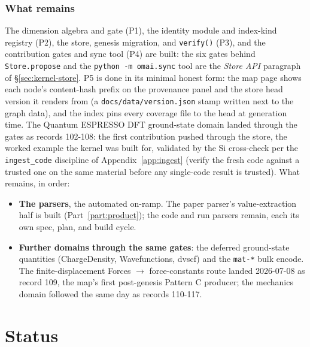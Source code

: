 \documentclass[11pt,a4paper]{article}
\begin{document}
\section{What remains}
\label{sec:kernel-remaining}

The dimension algebra and gate (P1), the identity module and index-kind registry
(P2), the store, genesis migration, and \texttt{verify()} (P3), and the
contribution gates and sync tool (P4) are built: the six gates behind
\texttt{Store.propose} and the \texttt{python -m omai.sync} tool are the
\emph{Store API} paragraph of \S\ref{sec:kernel-store}. P5 is done in its minimal honest form: the map page shows
each node's content-hash prefix on the provenance panel and the store head
version it renders from (a \texttt{docs/data/version.json} stamp written next to
the graph data), and the index pins every coverage file to the head at
generation time. The Quantum ESPRESSO DFT ground-state domain landed through the
gates as records 102-108: the first contribution pushed through the store, the
worked example the kernel was built for, validated by the Si cross-check per the
\texttt{ingest\_code} discipline of Appendix~\ref{app:ingest} (verify the fresh
code against a trusted one on the same material before any single-code result is
trusted). What remains, in order:
\begin{itemize}[leftmargin=2em, itemsep=0.2em]
  \item \textbf{The parsers}, the automated on-ramp. The paper parser's
        value-extraction half is built (Part~\ref{part:product}); the code and run
        parsers remain, each its own spec, plan, and build cycle.
  \item \textbf{Further domains through the same gates}: the deferred
        ground-state quantities (ChargeDensity, Wavefunctions, dvscf) and the
        \texttt{mat-*} bulk encode. The finite-displacement Forces $\to$
        force-constants route landed 2026-07-08 as record 109, the map's
        first post-genesis Pattern C producer; the mechanics domain followed
        the same day as records 110-117.
\end{itemize}

\part{Status}
\label{part:status}
\end{document}
